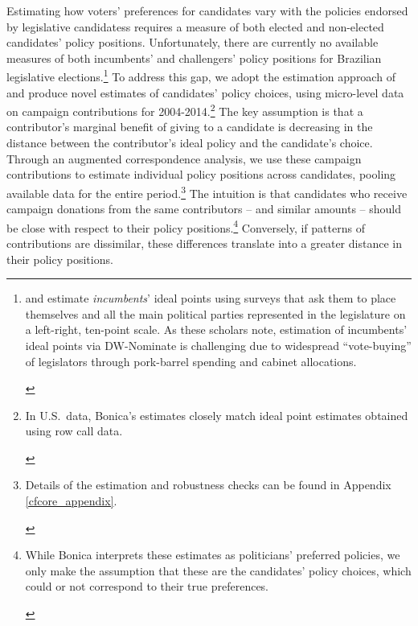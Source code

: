 \documentclass[12pt,english]{article}
\newcommand{\note}[1]{\footnote{ \begin{doublespace}#1  \end{doublespace}}}
\numberwithin{equation}{section}
\theoremstyle{plain}
\theoremstyle{remark}
\theoremstyle{plain}
\begin{document}
Estimating how voters' preferences for candidates vary with the policies endorsed by legislative candidatess requires a measure of both elected and non-elected candidates' policy positions. Unfortunately, there are currently no available measures of both incumbents' and challengers' policy positions for Brazilian legislative elections.\note{\normalsize {} and \citeasnoun{ZuccoLauderdale2011} estimate \emph{incumbents}' ideal points using surveys that ask them to place themselves and all the main political parties represented in the legislature on a left-right, ten-point scale. As these scholars note, estimation of incumbents' ideal points via DW-Nominate is challenging due to widespread ``vote-buying'' of legislators through pork-barrel spending and cabinet allocations.} %
To address this gap, we adopt the estimation approach of  and produce novel estimates of candidates' policy choices, using micro-level data on campaign contributions for 2004-2014.\note{\normalsize In U.S.\ data, Bonica's estimates closely match ideal point estimates obtained using row call data.} The key assumption is that a contributor's marginal benefit of giving to a candidate is decreasing in the distance between the contributor's ideal policy and the candidate's choice. Through an augmented correspondence analysis, we use these campaign contributions to estimate individual policy positions across candidates, pooling available data for the entire period.\note{Details of the estimation and robustness checks can be found in Appendix \ref{cfcore_appendix}.} The intuition is that candidates who receive campaign donations from the same contributors -- and similar amounts -- should be close with respect to their policy positions.\note{\normalsize While Bonica interprets these estimates as politicians' preferred policies, we  only make the assumption that these are the candidates' policy choices, which could or not correspond to their true preferences.} Conversely, if patterns of contributions are dissimilar, these differences translate into a greater distance in their policy positions.
    
\end{document}
